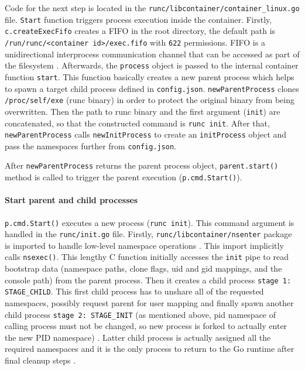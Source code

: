 Code for the next step is located in the \texttt{runc/libcontainer/container\_linux.go} file. \texttt{Start} function triggers process execution inside the container. Firstly, \texttt{c.createExecFifo} creates a FIFO in the root directory, the default path is \texttt{/run/runc/<container id>/exec.fifo} with \texttt{622} permissions. FIFO is a unidirectional interprocess communication channel that can be accessed as part of the filesystem \cite{m:fifo}. Afterwards, the \texttt{process} object is passed to the internal container function \texttt{start}. This function basically creates a new parent process which helps to spawn a target child process defined in \texttt{config.json}. \texttt{newParentProcess} clones \texttt{/proc/self/exe} (runc binary) in order to protect the original binary from being overwritten. Then the path to runc binary and the first argument (\texttt{init}) are concatenated, so that the constructed command is \texttt{runc init}. After that, \texttt{newParentProcess} calls \texttt{newInitProcess} to create an \texttt{initProcess} object and pass the namespaces further from \texttt{config.json}.

After \texttt{newParentProcess} returns the parent process object, \texttt{parent.start()} method is called to trigger the parent execution (\texttt{p.cmd.Start()}).

\paragraph*{Start parent and child processes}

\texttt{p.cmd.Start()} executes a new process (\texttt{runc init}). This command argument is handled in the \texttt{runc/init.go} file. Firstly, \linebreak \texttt{runc/libcontainer/nsenter} package is imported to handle low-level namespace operations \cite{sof:1}. This import implicitly calls \texttt{nsexec()}. This lengthy C function initially accesses the \texttt{init} pipe to read bootstrap data (namespace paths, clone flags, uid and gid mappings, and the console path) from the parent process. Then it creates a child process \texttt{stage 1: STAGE\_CHILD}. This first child process has to unshare all of the requested namespaces, possibly request parent for user mapping and finally spawn another child process \texttt{stage 2: STAGE\_INIT} (as mentioned above, pid namespace of calling process must not be changed, so new process is forked to actually enter the new PID namespace) \cite{gh:nsexec}. Latter child process is actually assigned all the required namespaces and it is the only process to return to the Go runtime after final cleanup steps \cite{b:terenceli}.


